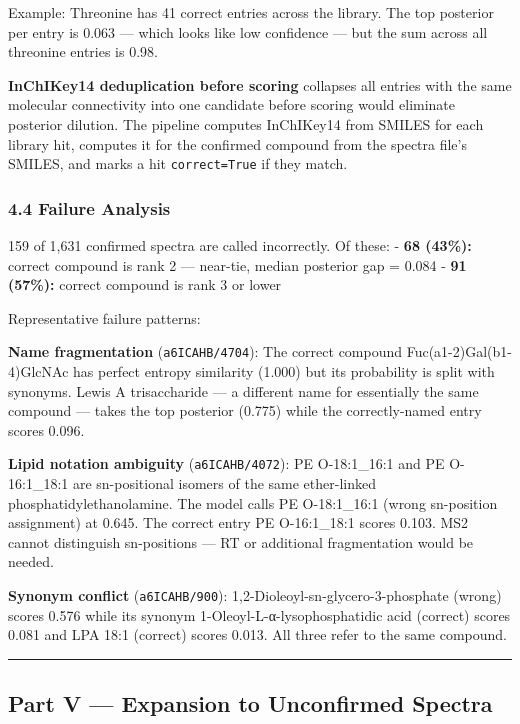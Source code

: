 Example: Threonine has 41 correct entries across the library. The top
posterior per entry is 0.063 --- which looks like low confidence --- but
the sum across all threonine entries is 0.98.

\textbf{InChIKey14 deduplication before scoring} collapses all entries
with the same molecular connectivity into one candidate before scoring
would eliminate posterior dilution. The pipeline computes InChIKey14
from SMILES for each library hit, computes it for the confirmed compound
from the spectra file's SMILES, and marks a hit \texttt{correct=True} if
they match.

\subsubsection{4.4 Failure Analysis}\label{failure-analysis}

159 of 1,631 confirmed spectra are called incorrectly. Of these: -
\textbf{68 (43\%):} correct compound is rank 2 --- near-tie, median
posterior gap = 0.084 - \textbf{91 (57\%):} correct compound is rank 3
or lower

Representative failure patterns:

\textbf{Name fragmentation} (\texttt{a6ICAHB/4704}): The correct
compound Fuc(a1-2)Gal(b1-4)GlcNAc has perfect entropy similarity (1.000)
but its probability is split with synonyms. Lewis A trisaccharide --- a
different name for essentially the same compound --- takes the top
posterior (0.775) while the correctly-named entry scores 0.096.

\textbf{Lipid notation ambiguity} (\texttt{a6ICAHB/4072}): PE
O-18:1\_16:1 and PE O-16:1\_18:1 are sn-positional isomers of the same
ether-linked phosphatidylethanolamine. The model calls PE O-18:1\_16:1
(wrong sn-position assignment) at 0.645. The correct entry PE
O-16:1\_18:1 scores 0.103. MS2 cannot distinguish sn-positions --- RT or
additional fragmentation would be needed.

\textbf{Synonym conflict} (\texttt{a6ICAHB/900}):
1,2-Dioleoyl-sn-glycero-3-phosphate (wrong) scores 0.576 while its
synonym 1-Oleoyl-L-α-lysophosphatidic acid (correct) scores 0.081 and
LPA 18:1 (correct) scores 0.013. All three refer to the same compound.

\begin{center}\rule{0.5\linewidth}{0.5pt}\end{center}

\subsection{Part V --- Expansion to Unconfirmed
Spectra}\label{part-v-expansion-to-unconfirmed-spectra}

